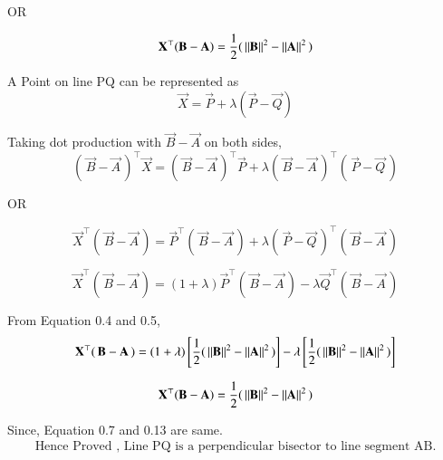 \documentclass[journal]{IEEEtran}
\begin{document}
\begin{center}
    OR
\end{center}


\begin{equation}
    \mathbf{X}^\top(\mathbf{B}-\mathbf{A}) = \dfrac{1}{2}(\, \left\lVert\mathbf{B}\right\rVert^2 - \left\lVert\mathbf{A}\right\rVert^2 \,)
\end{equation}

\bigskip

A Point on line PQ can be represented as
\begin{equation}
    \vec{X} = \vec{P} + \lambda(\vec{P}-\vec{Q})
\end{equation}

Taking dot production with $\vec{B} - \vec{A}$ on both sides,
\begin{equation}
    (\, \vec{B} - \vec{A} \,)^\top \vec{X} = (\, \vec{B} - \vec{A} \,)^\top \vec{P} + \lambda(\, \vec{B} - \vec{A} \,)^\top(\, \vec{P} - \vec{Q} \,)
\end{equation}

\begin{center}
    OR
\end{center}

\begin{equation}
    \vec{X}^\top(\, \vec{B} - \vec{A} \,) = \vec{P}^\top(\, \vec{B} - \vec{A} \,) + \lambda(\, \vec{P} - \vec{Q} \,)^\top(\, \vec{B} - \vec{A} \,)
\end{equation}

\begin{equation}
   \vec{X}^\top(\, \vec{B} - \vec{A} \,) = (1+\lambda)\vec{P}^\top(\, \vec{B} - \vec{A} \,) - \lambda\vec{Q}^\top(\, \vec{B} - \vec{A} \,)
\end{equation}


From Equation 0.4 and 0.5,
\begin{equation}
    \mathbf{X}^\top(\, \mathbf{B} - \mathbf{A} \,) = (1+\lambda)\left[\dfrac{1}{2}(\, \left\lVert\mathbf{B}\right\rVert^2 - \left\lVert\mathbf{A}\right\rVert^2 \,)\right]  - \lambda\left[\dfrac{1}{2}(\, \left\lVert\mathbf{B}\right\rVert^2 - \left\lVert\mathbf{A}\right\rVert^2 \,)\right]
\end{equation}

\begin{equation}
    \mathbf{X}^\top(\mathbf{B}-\mathbf{A}) = \dfrac{1}{2}(\, \left\lVert\mathbf{B}\right\rVert^2 - \left\lVert\mathbf{A}\right\rVert^2 \,)
\end{equation}

\bigskip

Since, Equation 0.7 and 0.13 are same.
\begin{align*}
    \boxed{\text{Hence Proved , Line PQ is a perpendicular bisector to line segment AB.}}
\end{align*}
\end{document}
